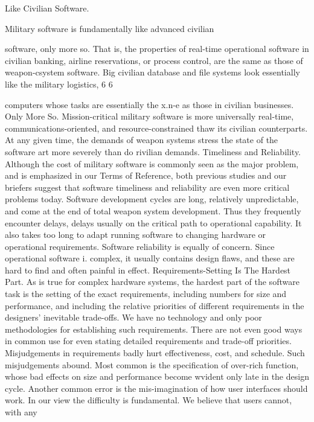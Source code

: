 \documentclass[12pt]{article}
\begin{document}
Like Civilian Software.

Military software is fundamentally like advanced civilian

software, only more so. That is, the properties of real-time operational software in civilian
banking, airline reservations, or process control, are the same as those of weapon-csystem
software. Big civilian database and file systems look essentially like the military logistics,
6
6%

computers whose tasks are essentially the x.n-e as those in civilian businesses.
Only More So.
Mission-critical military software is more universally real-time,
communications-oriented, and resource-constrained thaw its civilian counterparts. At any
given time, the demands of weapon systems stress the state of the software art more
severely than do rivilian demands.
Timeliness and Reliability. Although the cost of military software is commonly seen
as the major problem, and is emphasized in our Terms of Reference, both previous studies
and our briefers suggest that software timeliness and reliability are even more critical
problems today.
Software development cycles are long, relatively unpredictable, and come at the end of
total weapon system development. Thus they frequently encounter delays, delays usually
on the critical path to operational capability. It also takes too long to adapt running
software to changing hardware or operational requirements.
Software reliability is equally of concern. Since operational software i. complex, it
usually contains design flaws, and these are hard to find and often painful in effect.
Requirements-Setting Is The Hardest Part.
As is true for complex hardware
systems, the hardest part of the software task is the setting of the exact requirements,
including numbers for size and performance, and including the relative priorities of different
requirements in the designers' inevitable trade-offs.
We have no technology and only poor methodologies for establishing such requirements.
There are not even good ways in common use for even stating detailed requirements and
trade-off priorities. Misjudgements in requirements badly hurt effectiveness, cost, and
schedule. Such misjudgements abound. Most common is the specification of over-rich
function, whose bad effects on size and performance become wvident only late in the design
cycle. Another common error is the mis-imagination of how user interfaces should work.
In our view the difficulty is fundamental. We believe that users cannot, with any
\end{document}
